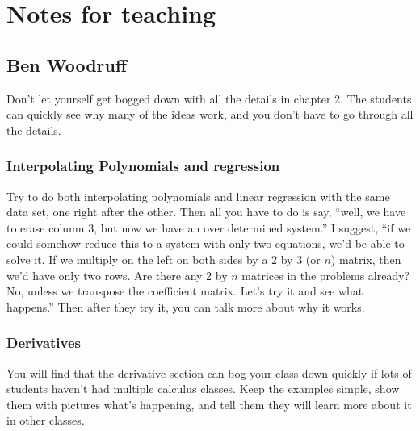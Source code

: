 \section{Notes for teaching}

\subsection{Ben Woodruff}

Don't let yourself get bogged down with all the details in chapter 2. The students can quickly see why many of the ideas work, and you don't have to go through all the details. 

\subsubsection{Interpolating Polynomials and regression}

Try to do both interpolating polynomials and linear regression with the same data set, one right after the other.  Then all you have to do is say, ``well, we have to erase column 3, but now we have an over determined system.'' I suggest, ``if we could somehow reduce this to a system with only two equations, we'd be able to solve it.  If we multiply on the left on both sides by a 2 by 3 (or $n$) matrix, then we'd have only two rows.  Are there any 2 by $n$ matrices in the problems already? No, unless we transpose the coefficient matrix.  Let's try it and see what happens.''  Then after they try it, you can talk more about why it works.

\subsubsection{Derivatives}

You will find that the derivative section can bog your class down quickly if lots of students haven't had multiple calculus classes. Keep the examples simple, show them with pictures what's happening, and tell them they will learn more about it in other classes. 
